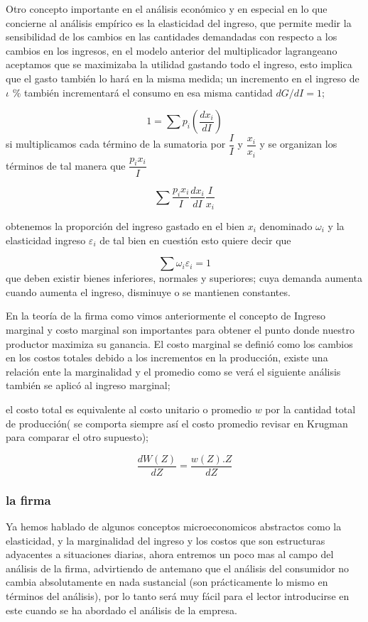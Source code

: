 \documentclass[12pt]{article}
\begin{document}
Otro concepto importante en el análisis económico y en especial en lo que concierne al análisis empírico es la elasticidad del ingreso, que permite medir la sensibilidad de los cambios en las cantidades demandadas con respecto a los cambios en los ingresos, en el modelo anterior  del multiplicador lagrangeano  aceptamos que se maximizaba la utilidad gastando todo el ingreso, esto implica que el gasto también lo hará en la misma medida; un incremento en el ingreso de $\iota$ \% también incrementará el consumo en esa misma cantidad $dG/dI=1$;

$$1 = \sum p_{i}(\dfrac{dx_{i}}{dI})$$
si multiplicamos cada término de la sumatoria por $\dfrac{I}{I}$ y $\dfrac{x_{i}}{x_{i}}$ y se organizan los términos de tal manera que $\dfrac{p_{i}x_{i}}{I}$


$$ \sum \dfrac{p_{i}x_{i}}{I} \dfrac{dx_{i}}{dI} \dfrac{I}{x_{i}}$$

obtenemos la proporción del ingreso  gastado en el bien $x_{i}$ denominado $\omega_{i}$ y la elasticidad ingreso $ \varepsilon_{i}$ de tal bien en cuestión esto quiere decir que 

$$ \sum \omega_{i} \varepsilon_{i}=1 $$  que deben existir bienes inferiores,  normales y superiores; cuya demanda aumenta cuando aumenta el ingreso, disminuye o se mantienen constantes.


En la teoría de la firma como vimos anteriormente el concepto de Ingreso marginal y costo marginal son importantes para obtener el punto donde nuestro productor maximiza su ganancia.  El costo marginal se definió como los cambios en los costos totales debido a los incrementos en la producción, existe una relación ente la marginalidad y el promedio como se verá el siguiente análisis también se aplicó al ingreso marginal;

el costo total es equivalente al costo unitario o promedio $w$ por la cantidad total de producción( se comporta siempre así el costo promedio revisar en Krugman para comparar el otro supuesto); 

$$\dfrac{dW(Z)}{dZ}= \dfrac{w(Z).Z}{dZ}$$


\subsubsection{la firma}



Ya hemos hablado de algunos conceptos microeconomicos abstractos como la elasticidad, y la marginalidad del ingreso y los costos que son estructuras adyacentes a situaciones diarias, ahora entremos un poco mas al campo del análisis de la firma, advirtiendo  de antemano que el análisis del consumidor no cambia absolutamente en nada sustancial (son prácticamente lo mismo en términos del análisis), por lo tanto será muy fácil para el lector introducirse en este cuando se ha abordado el análisis de la empresa.
\end{document}
